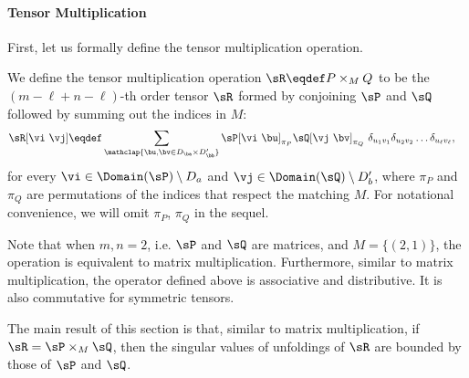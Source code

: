 
% 

\paragraph{Tensor Multiplication}
First, let us formally define the tensor multiplication operation.

\begin{definition}
  We define the tensor multiplication operation $\sR \eqdef P \times_{M}
  Q$ to be the $(m - \ell + n - \ell)$-th order tensor $\sR$ formed by
  conjoining $\sP$ and $\sQ$ followed by summing out the indices in $M$:
\begin{align*}
  \sR[\vi\ \vj] &\eqdef \sum_{\mathclap{\bu, \bv \in D_\ba \times D'_\bb}} \sP[\vi \  \bu]_{\pi_P} \sQ[\vj \  \bv]_{\pi_Q} ~ \delta_{u_1 v_1} \delta_{u_2 v_2} \ldots \delta_{u_\ell v_\ell},
\end{align*}
  for every $\vi \in \Domain(\sP) \setminus D_a$ and $\vj \in
  \Domain(\sQ) \setminus D'_b$, where $\pi_P$ and $\pi_Q$ are
  permutations of the indices that respect the matching $M$. For
  notational convenience, we will omit $\pi_P$, $\pi_Q$ in the sequel.
\end{definition}

Note that when $m, n = 2$, i.e. $\sP$ and $\sQ$ are matrices, and $M
  = \{(2,1)\}$, the operation is equivalent to matrix multiplication. 
Furthermore, similar to matrix multiplication, the operator defined above
  is associative and distributive. 
It is also commutative for symmetric tensors.

The main result of this section is that, similar to matrix
multiplication, if $\sR = \sP \times_{M} \sQ$, then the singular values
of unfoldings of $\sR$ are bounded by those of $\sP$ and $\sQ$.

